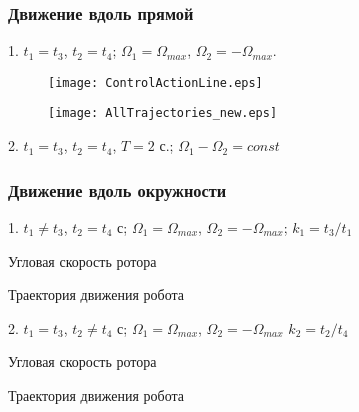 \begin{frame}
\frametitle{Движение вдоль прямой}

1. $t_1=t_3$, $ t_2 = t_4$; \quad $ \Omega_1 = \Omega_{max} $, $ \Omega_2 = -\Omega_{max} $.

\begin{minipage}[t]{0.3\linewidth}
	\begin{figure}[!ht]
		\centering
		\texttt{[image: ControlActionLine.eps]}
	\end{figure}	
\end{minipage}
\hfill
\begin{minipage}[t]{0.68\linewidth}
	\begin{figure}[!ht]
		\centering
		\texttt{[image: AllTrajectories\_new.eps]}
	\end{figure}
\end{minipage}	
	
2. 	$t_1=t_3$, $ t_2 = t_4$, $ T=2 $ с.; \quad $ \Omega_1 - \Omega_2 = const$

\begin{minipage}[h]{0.47\linewidth}
\end{minipage}
\hfill
\begin{minipage}[h]{0.47\linewidth}
\end{minipage}


\end{frame}



\begin{frame}
\frametitle{Движение вдоль окружности}

1. $t_1 \neq t_3$, $t_2 = t_4$ с; \quad	$ \Omega_1 = \Omega_{max} $, $ \Omega_2 = -\Omega_{max} $; \quad $ k_1 = t_3 / t_1 $
		
	
	\begin{minipage}[t]{0.47\linewidth}
	{Угловая скорость ротора}
	\end{minipage}
	\hfill
	\begin{minipage}[t]{0.47\linewidth}
		{Траектория движения робота}
	\end{minipage}

\vspace{4mm}

2. $t_1 = t_3$, $t_2 \neq t_4$ с; \quad $ \Omega_1 = \Omega_{max} $, $ \Omega_2 = -\Omega_{max} $ \quad $ k_2 = t_2 / t_4 $

\begin{minipage}[t]{0.47\linewidth}
	{Угловая скорость ротора}
\end{minipage}
\hfill
\begin{minipage}[t]{0.47\linewidth}
	{Траектория движения робота}
\end{minipage}

\end{frame}


